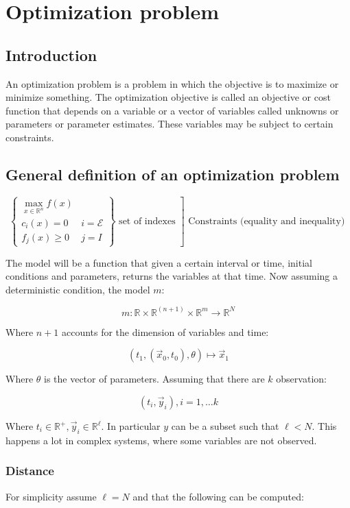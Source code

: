 \chapter{Optimization problem}

\section{Introduction}
An optimization problem is a problem in which the objective is to maximize or minimize something.
The optimization objective is called an objective or cost function that depends on a variable or a vector of variables called unknowns or parameters or parameter estimates.
These variables may be subject to certain constraints.

\section{General definition of an optimization problem}

$$\left.\left\{\begin{array}{ll} \max _{x \in \mathbb{R}^n} f(x) & \\ c_i(x)=0 & i=\mathcal{E}\\ f_j(x) \geq 0 & j = I \end{array}\right\} \text { set of indexes }\right] \text { Constraints (equality and inequality) }$$

The model will be a function that given a certain interval or time, initial conditions and parameters, returns the variables at that time.
Now assuming a deterministic condition, the model $m$:

$$m: \mathbb{R} \times \mathbb{R}^{(n+1)} \times \mathbb{R}^m \rightarrow \mathbb{R}^N$$

Where $n+1$ accounts for the dimension of variables and time:

$$\left(t_1,\left(\vec{x}_0, t_0\right), \theta\right)\longmapsto \vec{x}_1 $$

Where $\theta$ is the vector of parameters.
Assuming that there are $k$ observation:

$$(t_i ,\vec{y}_i), i=1, \ldots k$$

Where $t_i \in \mathbb{R}^+, \vec{y}_i \in \mathbb{R}^\ell$.
In particular $y$ can be a subset such that $\ell<N$.
This happens a lot in complex systems, where some variables are not observed.

  \subsection{Distance}
  For simplicity assume $\ell = N$ and that the following can be computed:

